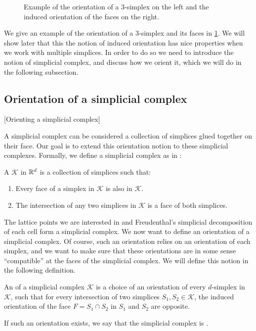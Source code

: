 \begin{figure}[ht]
	\centering
	\caption[Orientation of a simplex]{Example of the orientation of a 3-simplex on the left and the induced orientation of the faces on the right.}\label{fig:orientation_of_simplex}
\end{figure}

We give an example of the orientation of a 3-simplex and its faces in \cref{fig:orientation_of_simplex}. We will show later that this the notion of induced orientation has nice properties when we work with multiple simplices. In order to do so we need to introduce the notion of simplicial complex, and discuss how we orient it, which we will do in the following subsection.

\subsection{Orientation of a simplicial complex}[Orienting a simplicial complex]

A simplicial complex can be considered a collection of simplices glued together on their face. Our goal is to extend this orientation notion to these simplicial complexes. Formally, we define a simplicial complex as in :

\begin{definition}
	A  $\mathcal{K}$ in $\mathbb{R}^d$ is a collection of simplices such that:
	\begin{enumerate}
		\item Every face of a simplex in $\mathcal{K}$ is also in $\mathcal{K}$.
		\item The intersection of any two simplices in $\mathcal{K}$ is a face of both simplices.
	\end{enumerate}
\end{definition}

The lattice points we are interested in and Freudenthal's simplicial decomposition of each cell form a simplicial complex. We now want to define an orientation of a simplicial complex. Of course, such an orientation relies on an orientation of each simplex, and we want to make sure that these orientations are in some sense ``compatible'' at the faces of the simplicial complex. We will define this notion in the following definition.

\begin{definition}
	An  of a simplicial complex $\mathcal{K}$ is a choice of an orientation of every $d$-simplex in $\mathcal{K}$, such that for every intersection of two simplices $S_1, S_2 \in \mathcal{K}$, the induced orientation of the face $F = S_1 \cap S_2$ in $S_1$ and $S_2$ are opposite. \par
	If such an orientation exists, we say that the simplicial complex is .
\end{definition}

